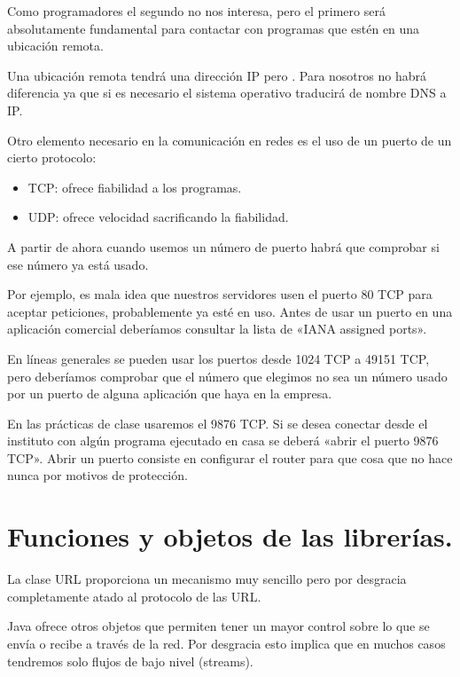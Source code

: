 \documentclass[letterpaper,10pt,spanish]{sphinxmanual}
\begin{document}
Como programadores el segundo no nos interesa, pero el primero será absolutamente fundamental para contactar con programas que estén en una ubicación remota.

Una ubicación remota  tendrá una dirección
IP pero . Para nosotros no habrá diferencia ya que si es necesario el sistema operativo traducirá de nombre DNS a IP.

Otro elemento necesario en la comunicación en redes es el uso de un puerto de un cierto protocolo:
\begin{itemize}
\item {} 
TCP: ofrece fiabilidad a los programas.

\item {} 
UDP: ofrece velocidad sacrificando la fiabilidad.

\end{itemize}

A partir de ahora cuando usemos un número de puerto habrá que comprobar si ese número ya está usado.

Por ejemplo, es mala idea que nuestros servidores usen el puerto 80 TCP para aceptar peticiones, probablemente ya esté en uso.
Antes de usar un puerto en una aplicación comercial deberíamos consultar la lista de «IANA assigned ports».

En líneas generales se pueden usar los puertos desde 1024 TCP a 49151 TCP, pero deberíamos comprobar que el número que elegimos no sea un número usado por un puerto de alguna aplicación que haya en la empresa.

En las prácticas de clase usaremos el 9876 TCP. Si se desea conectar desde el instituto con algún programa ejecutado en casa se deberá «abrir el puerto 9876 TCP». Abrir un puerto consiste en configurar el router para que  cosa que no hace nunca por motivos de protección.


\section{Funciones y objetos de las librerías.}
\label{\detokenize{textos/tema3:funciones-y-objetos-de-las-librerias}}
La clase URL proporciona un mecanismo muy sencillo pero por desgracia completamente atado al protocolo de las URL.

Java ofrece otros objetos que permiten tener un mayor control sobre lo que se envía o recibe a través de la red. Por desgracia esto implica que en muchos casos tendremos solo flujos de bajo nivel (streams).
\end{document}
